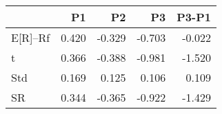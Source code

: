 \begin{tabular}{lrrrr}
\toprule
 & P1 & P2 & P3 & P3-P1 \\
\midrule
E[R]--Rf & 0.420 & -0.329 & -0.703 & -0.022 \\
t & 0.366 & -0.388 & -0.981 & -1.520 \\
Std & 0.169 & 0.125 & 0.106 & 0.109 \\
SR & 0.344 & -0.365 & -0.922 & -1.429 \\
\bottomrule
\end{tabular}
